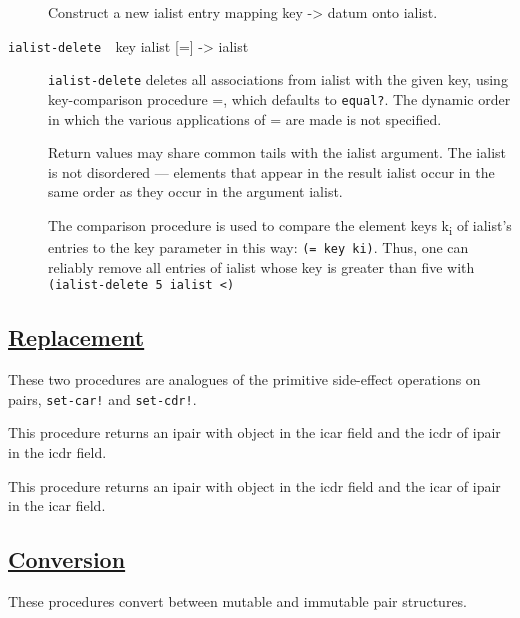 \begin{description}
Construct a new ialist entry mapping key -\textgreater{} datum onto
ialist.
\item[ \href{}{} \texttt{ialist-delete~~}key ialist {[}={]}
-\textgreater{} ialist ]
\texttt{ialist-delete} deletes all associations from ialist with the
given key, using key-comparison procedure =, which defaults to
\texttt{equal?}. The dynamic order in which the various applications of
= are made is not specified.

Return values may share common tails with the ialist argument. The
ialist is not disordered --- elements that appear in the result ialist
occur in the same order as they occur in the argument ialist.

The comparison procedure is used to compare the element keys
k\textsubscript{i} of ialist's entries to the key parameter in this way:
\texttt{(=\ key\ ki)}. Thus, one can reliably remove all entries of
ialist whose key is greater than five with
\texttt{(ialist-delete\ 5\ ialist\ \textless{})}
\end{description}

\subsection{\texorpdfstring{\href{}{Replacement}}{Replacement}}\label{replacement}

These two procedures are analogues of the primitive side-effect
operations on pairs, \texttt{set-car!} and \texttt{set-cdr!}.

\begin{description}
\tightlist
\item[ \href{}{} \texttt{replace-icar} ipair object -\textgreater{}
ipair ]
This procedure returns an ipair with object in the icar field and the
icdr of ipair in the icdr field.
\item[ \href{}{} \texttt{replace-icdr} ipair object -\textgreater{}
ipair ]
This procedure returns an ipair with object in the icdr field and the
icar of ipair in the icar field.
\end{description}

\subsection{\texorpdfstring{\href{}{Conversion}}{Conversion}}\label{conversion}

These procedures convert between mutable and immutable pair structures.

